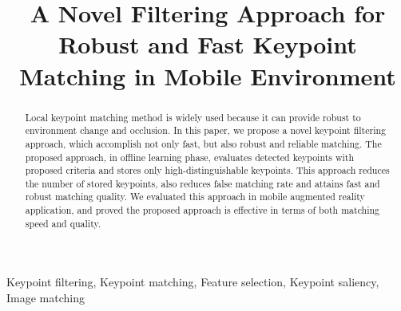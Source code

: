 \documentclass{article}
\title{A Novel Filtering Approach for Robust and Fast Keypoint Matching in Mobile Environment}
\begin{document}
%
\maketitle
%
\begin{abstract}
Local keypoint matching method is widely used because it can provide robust to environment change and occlusion. In this paper, we propose a novel keypoint filtering approach, which accomplish not only fast, but also robust and reliable matching. The proposed approach, in offline learning phase, evaluates detected keypoints with proposed criteria and stores only high-distinguishable keypoints. This approach reduces the number of stored keypoints, also reduces false matching rate and attains fast and robust matching quality. We evaluated this approach in mobile augmented reality application, and proved the proposed approach is effective in terms of both matching speed and quality.


\end{abstract}
%
\begin{keywords}
Keypoint filtering, Keypoint matching, Feature selection, Keypoint saliency, Image matching
\end{keywords}
%








\end{document}
